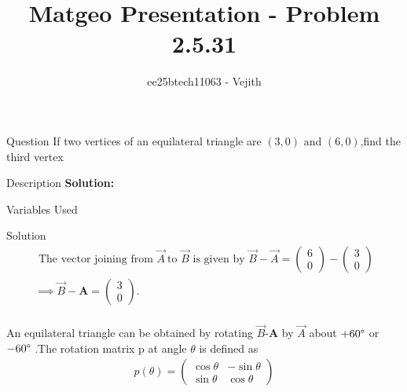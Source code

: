 \documentclass{beamer}
\title{Matgeo Presentation - Problem 2.5.31}
\author{ee25btech11063 - Vejith}
\numberwithin{equation}{section}
\providecommand{\brak}[1]{\ensuremath{\left(#1\right)}}
\theoremstyle{remark}
\newcommand{\myvec}[1]{\ensuremath{\begin{pmatrix}#1\end{pmatrix}}}
\let\vec\mathbf
\begin{document}
\frame{\titlepage}
\begin{frame}{Question}
If two vertices of an equilateral triangle are \brak{3,0} and \brak{6,0},find the third vertex
\end{frame}

\begin{frame}{Description}
\textbf{Solution: }\\
\begin{table}[h!]    
  \centering
  
  \caption{Variables Used}
  \label{}
\end{table}
\end{frame}

\begin{frame}{Solution}
\begin{align}
   \text{ The vector joining from }\Vec{A}\ \text{to } \Vec{B} \text{ is given by } \Vec{B}-\Vec{A}=\myvec{6\\0}-\myvec{3\\0}\\
\implies \Vec{B}-\vec{A}=\myvec{3\\0}.\\
\end{align}

An equilateral triangle can be obtained by rotating $\Vec{B}$-$\vec{A}$ by $\Vec{A}$ about $+60\degree$ or $-60\degree$ .The rotation matrix p at angle $\theta$ is defined as\\
\vspace{0.5cm}
\begin{align}
    p(\theta)=\myvec{
   \cos \theta & -\sin \theta
    \\
   \sin \theta & \cos \theta
   }\\
\end{align}
\end{frame}
\end{document}
